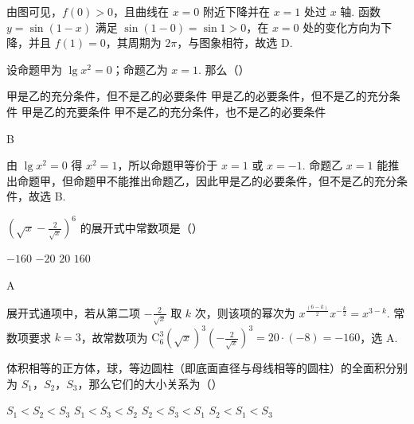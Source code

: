 \documentclass[UTF8,a4paper,oneside,11pt]{ctexbook}
\begin{document}
\begin{solution}
由图可见，\(f(0)>0\)，且曲线在 \(x=0\) 附近下降并在 \(x=1\) 处过 \(x\) 轴. 函数 \(y=\sin(1-x)\) 满足 \(\sin(1-0)=\sin1>0\)，在 \(x=0\) 处的变化方向为下降，并且 \(f(1)=0\)，其周期为 \(2\pi\)，与图象相符，故选 D.
\end{solution}

\begin{problem}
设命题甲为 \(\lg x^2=0\)；命题乙为 \(x=1\). 那么（\quad）

\choices
    {甲是乙的充分条件，但不是乙的必要条件}
    {甲是乙的必要条件，但不是乙的充分条件}
    {甲是乙的充要条件}
    {甲不是乙的充分条件，也不是乙的必要条件}

\end{problem}

\begin{answer}
B
\end{answer}

\begin{solution}
由 \(\lg x^2=0\) 得 \(x^2=1\)，所以命题甲等价于 \(x=1\) 或 \(x=-1\). 命题乙 \(x=1\) 能推出命题甲，但命题甲不能推出命题乙，因此甲是乙的必要条件，但不是乙的充分条件，故选 B.
\end{solution}

\begin{problem}
\(\left(\sqrt{x}-\frac{2}{\sqrt{x}}\right)^6\) 的展开式中常数项是（\quad）

\choices
    {\(-160\)}
    {\(-20\)}
    {\(20\)}
    {\(160\)}

\end{problem}

\begin{answer}
A
\end{answer}

\begin{solution}
展开式通项中，若从第二项 \(-\frac{2}{\sqrt{x}}\) 取 \(k\) 次，则该项的幂次为 \(x^{\frac{(6-k)}{2}}x^{-\frac{k}{2}}=x^{3-k}\). 常数项要求 \(k=3\)，故常数项为 \(\mathrm C_6^3(\sqrt{x})^3\left(-\frac{2}{\sqrt{x}}\right)^3=20\cdot(-8)=-160\)，选 A.
\end{solution}

\begin{problem}
体积相等的正方体，球，等边圆柱（即底面直径与母线相等的圆柱）的全面积分别为 \(S_1\)，\(S_2\)，\(S_3\)，那么它们的大小关系为（\quad）

\choices
    {\(S_1<S_2<S_3\)}
    {\(S_1<S_3<S_2\)}
    {\(S_2<S_3<S_1\)}
    {\(S_2<S_1<S_3\)}

\end{problem}
\end{document}
